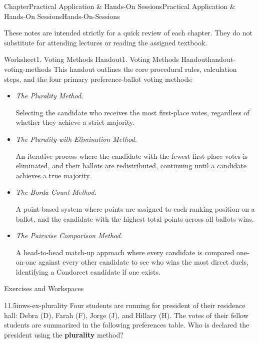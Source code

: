 \documentclass[oneside,10pt,]{book}
\newcommand{\ptxlistdisc}{\raisebox{0.3ex}{\textbullet}}
\newcommand{\terminology}[1]{\textbf{#1}}
\newcommand{\lititle}[1]{{\slshape#1}}
\begin{document}
\begin{chapterptx}{Chapter}{Practical Application \& Hands-On Sessions}{}{Practical Application \& Hands-On Sessions}{}{}{Hands-On-Sessions}
\renewcommand*{\chaptername}{Chapter}
\begin{introduction}{}%
These notes are intended strictly for a quick review of each chapter. They do not substitute for attending lectures or reading the assigned textbook.%
\end{introduction}%
%
%
\typeout{************************************************}
\typeout{************************************************}
%
\begin{worksheet-section}{Worksheet}{1. Voting Methods Handout}{}{1. Voting Methods Handout}{}{}{handout-voting-methods}
This handout outlines the core procedural rules, calculation steps, and the four primary preference-ballot voting methods:%
\begin{introduction}{}%
%
\begin{itemize}[label=\ptxlistdisc]
\item{}\lititle{The Plurality Method.}\par%
 Selecting the candidate who receives the most first-place votes, regardless of whether they achieve a strict majority.%
\item{}\lititle{The Plurality-with-Elimination Method.}\par%
 An iterative process where the candidate with the fewest first-place votes is eliminated, and their ballots are redistributed, continuing until a candidate achieves a true majority.%
\item{}\lititle{The Borda Count Method.}\par%
 A point-based system where points are assigned to each ranking position on a ballot, and the candidate with the highest total points across all ballots wins.%
\item{}\lititle{The Pairwise Comparison Method.}\par%
 A head-to-head match-up approach where every candidate is compared one-on-one against every other candidate to see who wins the most direct duels, identifying a Condorcet candidate if one exists.%
\end{itemize}
%
\end{introduction}%
Exercises and Workspaces%
\begin{divisionexercise}{1}{}{1.5in}{ws-ex-plurality}%
Four students are running for president of their residence hall: Debra (D), Farah (F), Jorge (J), and Hillary (H). The votes of their fellow students are summarized in the following preferences table. Who is declared the president using the \terminology{plurality} method?%

\end{divisionexercise}
\end{worksheet-section}
\end{chapterptx}
\end{document}
